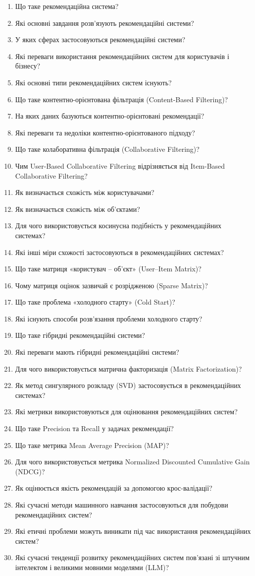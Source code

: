 \begin{enumerate}
\item Що таке рекомендаційна система?
\item Які основні завдання розв'язують рекомендаційні системи?
\item У яких сферах застосовуються рекомендаційні системи?
\item Які переваги використання рекомендаційних систем для користувачів і бізнесу?
\item Які основні типи рекомендаційних систем існують?
\item Що таке контентно-орієнтована фільтрація (Content-Based Filtering)?
\item На яких даних базуються контентно-орієнтовані рекомендації?
\item Які переваги та недоліки контентно-орієнтованого підходу?
\item Що таке колаборативна фільтрація (Collaborative Filtering)?
\item Чим User-Based Collaborative Filtering відрізняється від Item-Based Collaborative Filtering?
\item Як визначається схожість між користувачами?
\item Як визначається схожість між об'єктами?
\item Для чого використовується косинусна подібність у рекомендаційних системах?
\item Які інші міри схожості застосовуються в рекомендаційних системах?
\item Що таке матриця «користувач – об'єкт» (User–Item Matrix)?
\item Чому матриця оцінок зазвичай є розрідженою (Sparse Matrix)?
\item Що таке проблема «холодного старту» (Cold Start)?
\item Які існують способи розв'язання проблеми холодного старту?
\item Що таке гібридні рекомендаційні системи?
\item Які переваги мають гібридні рекомендаційні системи?
\item Для чого використовується матрична факторизація (Matrix Factorization)?
\item Як метод сингулярного розкладу (SVD) застосовується в рекомендаційних системах?
\item Які метрики використовуються для оцінювання рекомендаційних систем?
\item Що таке Precision та Recall у задачах рекомендації?
\item Що таке метрика Mean Average Precision (MAP)?
\item Для чого використовується метрика Normalized Discounted Cumulative Gain (NDCG)?
\item Як оцінюється якість рекомендацій за допомогою крос-валідації?
\item Які сучасні методи машинного навчання застосовуються для побудови рекомендаційних систем?
\item Які етичні проблеми можуть виникати під час використання рекомендаційних систем?
\item Які сучасні тенденції розвитку рекомендаційних систем пов'язані зі штучним інтелектом і великими мовними моделями (LLM)?
\end{enumerate}